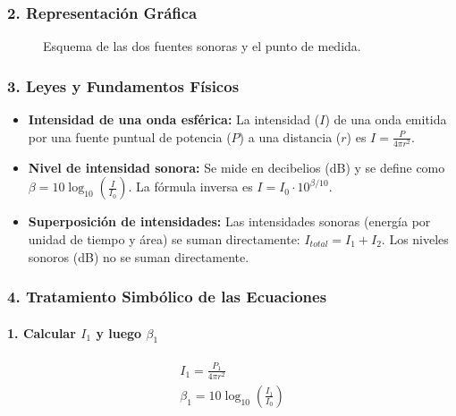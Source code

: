\subsubsection*{2. Representación Gráfica}
\begin{figure}[H]
    \centering
    \caption{Esquema de las dos fuentes sonoras y el punto de medida.}
\end{figure}

\subsubsection*{3. Leyes y Fundamentos Físicos}
\begin{itemize}
    \item \textbf{Intensidad de una onda esférica:} La intensidad ($I$) de una onda emitida por una fuente puntual de potencia ($P$) a una distancia ($r$) es $I = \frac{P}{4\pi r^2}$.
    \item \textbf{Nivel de intensidad sonora:} Se mide en decibelios (dB) y se define como $\beta = 10 \log_{10}\left(\frac{I}{I_0}\right)$. La fórmula inversa es $I = I_0 \cdot 10^{\beta/10}$.
    \item \textbf{Superposición de intensidades:} Las intensidades sonoras (energía por unidad de tiempo y área) se suman directamente: $I_{total} = I_1 + I_2$. Los niveles sonoros (dB) no se suman directamente.
\end{itemize}

\subsubsection*{4. Tratamiento Simbólico de las Ecuaciones}
\paragraph*{1. Calcular $I_1$ y luego $\beta_1$}
\begin{gather}
    I_1 = \frac{P_1}{4\pi r^2} \\
    \beta_1 = 10 \log_{10}\left(\frac{I_1}{I_0}\right)
\end{gather}
